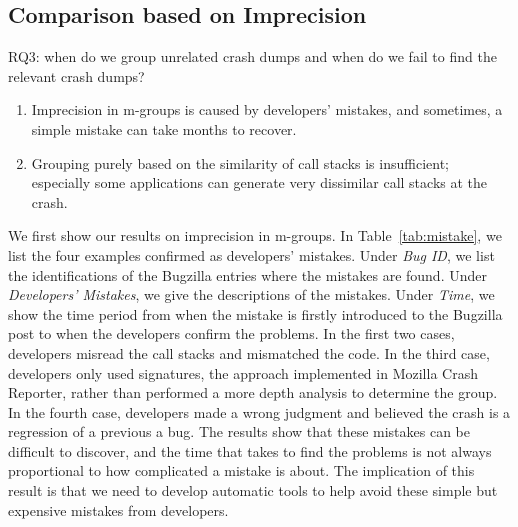 \subsection{Comparison based on Imprecision}

RQ3: when do we group unrelated crash dumps and when do we fail to find the relevant crash dumps? 

\begin{enumerate}
\item Imprecision in m-groups is caused by developers' mistakes, and sometimes, a simple mistake can take months to recover.
\item Grouping purely based on the similarity of call stacks is insufficient; especially some applications can generate very dissimilar call stacks at the crash.
\end{enumerate}

We first show our results on imprecision in m-groups. In Table~\ref{tab:mistake}, we list the four examples confirmed as developers' mistakes. Under {\it Bug ID}, we list the identifications of the Bugzilla entries where the mistakes are found. Under {\it Developers' Mistakes}, we give the descriptions of the mistakes. Under {\it Time}, we show the time period from when the mistake is firstly introduced to the Bugzilla post to when the developers confirm the problems. In the first two cases, developers misread the call stacks and mismatched the code. In the third case, developers only used signatures, the approach implemented in Mozilla Crash Reporter, rather than performed a more depth analysis to determine the group. In the fourth case, developers made a wrong judgment and believed the crash is a regression of a previous a bug. The results show that these mistakes can be difficult to discover, and the time that takes to find the problems is not always proportional to how complicated a mistake is about. The implication of this result is that we need to develop automatic tools to help avoid these simple but expensive mistakes from developers.
\begin{table}[!htb]
\centering
\caption{Imprecision in m-Groups: Example Mistakes\label{tab:mistake}}
\end{table}

